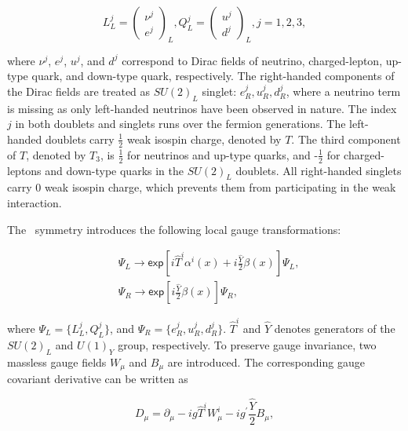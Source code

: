 \begin{equation}
L_{L}^{j}=\begin{pmatrix}\nu^{j}\\ e^{j}\end{pmatrix}_{L}, Q_{L}^{j}=\begin{pmatrix}u^j\\d^j\end{pmatrix}_{L}, j=1, 2, 3,
\end{equation}

where $\nu^{j}$, $e^{j}$, $u^{j}$, and $d^{j}$ correspond to Dirac fields of neutrino, charged-lepton, up-type quark, and down-type quark, respectively. The right-handed components of the Dirac fields are treated as $SU(2)_{L}$ singlet: $e_{R}^{j}, u_{R}^{j}, d_{R}^{j}$, where a neutrino term is missing as only left-handed neutrinos have been observed in nature. The index $j$ in both doublets and singlets runs over the fermion generations. The left-handed doublets carry $\frac{1}{2}$ weak isospin charge, denoted by $T$. The third component of $T$, denoted by $T_3$, is $\frac{1}{2}$ for neutrinos and up-type quarks, and -$\frac{1}{2}$ for charged-leptons and down-type quarks in the $SU(2)_{L}$ doublets. All right-handed singlets carry 0 weak isospin charge, which prevents them from participating in the weak interaction. 

The \ew~symmetry introduces the following local gauge transformations:

\begin{equation}
\begin{split}
&\Psi_{L}\rightarrow\textsf{exp}[i\hat{T}^{i}\alpha^{i}(x)+i\frac{\hat{Y}}{2}\beta(x)]\Psi_{L},\\
&\Psi_{R}\rightarrow\textsf{exp}[i\frac{\hat{Y}}{2}\beta(x)]\Psi_{R},
\end{split}
\end{equation}

where $\Psi_{L}=\{L_{L}^{j},Q_{L}^{j}\}$, and $\Psi_{R}=\{e_{R}^{j}, u_{R}^{j}, d_{R}^{j}\}$. $\hat{T}^{i}$ and $\hat{Y}$ denotes generators of the $SU(2)_{L}$ and $U(1)_{Y}$ group, respectively. To preserve gauge invariance, two massless gauge fields $W_{\mu}$ and $B_{\mu}$ are introduced. The corresponding gauge covariant derivative can be written as

\begin{equation}
\label{eq:EWCov}
D_{\mu}=\partial_{\mu}-ig\hat{T}^{i}W_{\mu}^{i}-ig^{\prime}\frac{\hat{Y}}{2}B_{\mu},
\end{equation}

